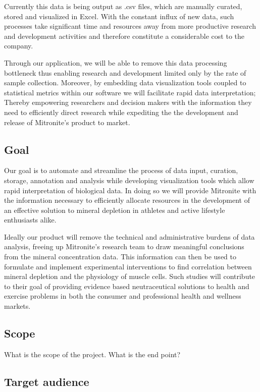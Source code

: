 \documentclass[10pt,twocolumn,letterpaper]{article}
\begin{document}
            Currently this data is being output as .csv files, which are manually curated, stored and visualized in Excel. With the constant influx of new data, such processes take significant time and resources away from more productive research and development activities and therefore constitute a considerable cost to the company.

            Through our application, we will be able to remove this data processing bottleneck thus enabling research and development limited only by the rate of sample collection. Moreover, by embedding data visualization tools coupled to statistical metrics within our software we will facilitate rapid data interpretation; Thereby empowering researchers and decision makers with the information they need to efficiently direct research while expediting the the development and release of Mitronite's product to market.

            \subsection{Goal}

            Our goal is to automate and streamline the process of data input, curation, storage, annotation and analysis while developing visualization tools which allow rapid interpretation of biological data. In doing so we will provide Mitronite with the information necessary to efficiently allocate resources in the development of an effective solution to mineral depletion in athletes and active lifestyle enthusiasts alike.

            Ideally our product will remove the technical and administrative burdens of data analysis, freeing up Mitronite's research team to draw meaningful conclusions from the mineral concentration data. This information can then be used to formulate and implement experimental interventions to find correlation between mineral depletion and the physiology of muscle cells. Such studies will contribute to their goal of providing evidence based neutraceutical solutions to health and exercise problems in both the consumer and professional health and wellness markets.

            \subsection{Scope}

            What is the scope of the project. What is the end point?

            \subsection{Target audience}
\end{document}

